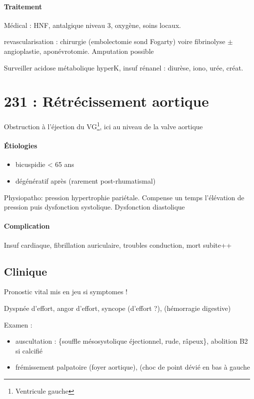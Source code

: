 \paragraph{Traitement}
Médical : HNF, antalgique niveau 3, oxygène, soins locaux.

revascularisation : chirurgie (embolectomie sond Fogarty) voire fibrinolyse
$\pm$ angioplastie, aponévrotomie. Amputation possible

Surveiller acidose métabolique hyperK, insuf rénanel : diurèse, iono, urée,
créat.









\section{231 : Rétrécissement aortique}%
\label{sec:231_retrecissement_aortique}
Obstruction à l'éjection du VG\footnote{Ventricule gauche}, ici au niveau de la
valve aortique

\paragraph{Étiologies} 
\begin{itemize}
  \item bicuspidie < 65 ans
  \item dégénératif après (rarement post-rhumatismal)
\end{itemize}

Physiopatho: \inc pression \thus hypertrophie pariétale. Compense un temps
l'élévation de pression puis dysfonction systolique. Dysfonction diastolique

\paragraph{Complication}
Insuf cardiaque, fibrillation auriculaire, troubles conduction, mort subite++

\subsection{Clinique}

Pronostic vital mis en jeu si symptomes ! \skull

Dyspnée d'effort, angor d'effort, syncope (d'effort ?), (hémorragie digestive)

Examen : 
\begin{itemize}
  \item auscultation : \{souffle mésosystolique éjectionnel, rude, râpeux\},
    abolition B2 si calcifié
  \item frémissement palpatoire (foyer aortique), (choc de point dévié en bas à
    gauche 
\end{itemize}

